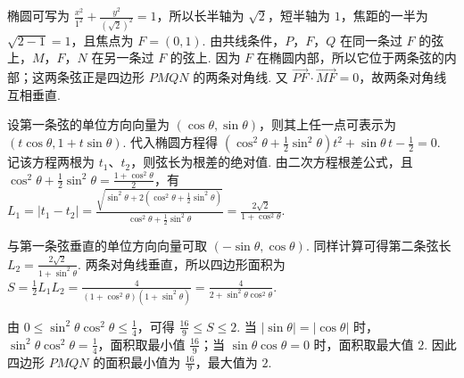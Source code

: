 \begin{solution}
椭圆可写为 \(\frac{x^{2}}{1^{2}}+\frac{y^{2}}{(\sqrt2)^{2}}=1\)，所以长半轴为 \(\sqrt2\)，短半轴为 \(1\)，焦距的一半为 \(\sqrt{2-1}=1\)，且焦点为 \(F=(0,1)\). 由共线条件，\(P\)，\(F\)，\(Q\) 在同一条过 \(F\) 的弦上，\(M\)，\(F\)，\(N\) 在另一条过 \(F\) 的弦上. 因为 \(F\) 在椭圆内部，所以它位于两条弦的内部；这两条弦正是四边形 \(PMQN\) 的两条对角线. 又 \(\overrightarrow{PF}\cdot\overrightarrow{MF}=0\)，故两条对角线互相垂直.

设第一条弦的单位方向向量为 \((\cos\theta,\sin\theta)\)，则其上任一点可表示为 \((t\cos\theta,1+t\sin\theta)\). 代入椭圆方程得
\(\left(\cos^{2}\theta+\frac12\sin^{2}\theta\right)t^{2}+\sin\theta\,t-\frac12=0\).
记该方程两根为 \(t_{1}\)、\(t_{2}\)，则弦长为根差的绝对值. 由二次方程根差公式，且 \(\cos^{2}\theta+\frac12\sin^{2}\theta=\frac{1+\cos^{2}\theta}{2}\)，有
\(L_{1}=|t_{1}-t_{2}|=\frac{\sqrt{\sin^{2}\theta+2\left(\cos^{2}\theta+\frac12\sin^{2}\theta\right)}}{\cos^{2}\theta+\frac12\sin^{2}\theta}=\frac{2\sqrt2}{1+\cos^{2}\theta}\).

与第一条弦垂直的单位方向向量可取 \((-\sin\theta,\cos\theta)\). 同样计算可得第二条弦长 \(L_{2}=\frac{2\sqrt2}{1+\sin^{2}\theta}\). 两条对角线垂直，所以四边形面积为
\(S=\frac12L_{1}L_{2}=\frac{4}{(1+\cos^{2}\theta)(1+\sin^{2}\theta)}=\frac{4}{2+\sin^{2}\theta\cos^{2}\theta}\).

由 \(0\leqslant\sin^{2}\theta\cos^{2}\theta\leqslant\frac14\)，可得 \(\frac{16}{9}\leqslant S\leqslant2\). 当 \(|\sin\theta|=|\cos\theta|\) 时，\(\sin^{2}\theta\cos^{2}\theta=\frac14\)，面积取最小值 \(\frac{16}{9}\)；当 \(\sin\theta\cos\theta=0\) 时，面积取最大值 \(2\). 因此四边形 \(PMQN\) 的面积最小值为 \(\frac{16}{9}\)，最大值为 \(2\).
\end{solution}

